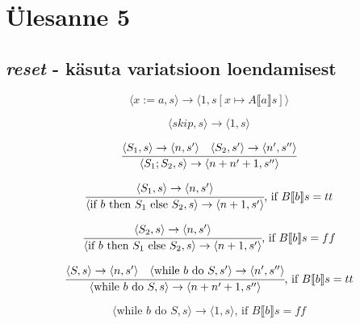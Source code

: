 \section{Ülesanne 5}

\subsection{\textit{reset} - käsuta variatsioon loendamisest}

\[
\langle x:=a,s \rangle \rightarrow
\langle 1, s[x \mapsto A \llbracket a \rrbracket s] \rangle
\]

\[
\langle skip,s \rangle \rightarrow
\langle 1, s \rangle
\]

\[
\cfrac{
  \langle S_1,s \rangle \rightarrow
  \langle n,s' \rangle
  \quad
  \langle S_2,s' \rangle \rightarrow
  \langle n',s'' \rangle
}{
  \langle S_1;S_2,s \rangle \rightarrow
  \langle n + n' + 1, s'' \rangle
}
\]

\[
\cfrac{
  \langle S_1,s \rangle \rightarrow
  \langle n,s' \rangle
}{
  \langle \text{if\ } b \text{\ then\ } S_1 \text{\ else\ } S_2,s \rangle
  \rightarrow
  \langle n + 1, s' \rangle
}\text{,\ if } B \llbracket b \rrbracket s = tt
\]

\[
\cfrac{
  \langle S_2,s \rangle \rightarrow
  \langle n,s' \rangle
}{
  \langle \text{if\ } b \text{\ then\ } S_1 \text{\ else\ } S_2,s \rangle
  \rightarrow
  \langle n + 1, s' \rangle
}\text{,\ if } B \llbracket b \rrbracket s = ff
\]

\[
\cfrac{
  \langle S,s \rangle \rightarrow
  \langle n,s' \rangle
  \quad
  \langle \text{while\ } b \text{\ do\ } S,s' \rangle
  \rightarrow
  \langle n', s'' \rangle
}{
  \langle \text{while\ } b \text{\ do\ } S,s \rangle
  \rightarrow
  \langle n + n' + 1, s'' \rangle
}\text{,\ if } B \llbracket b \rrbracket s = tt
\]

\[
\langle \text{while\ } b \text{\ do\ } S,s \rangle
\rightarrow
\langle 1, s \rangle
\text{,\ if } B \llbracket b \rrbracket s = ff
\]


